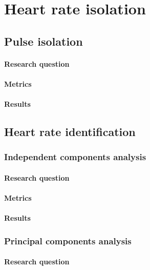 \section{Heart rate isolation}
\subsection{Pulse isolation}
\label{section:bss}
\paragraph{Research question}
\paragraph{Metrics}
\paragraph{Results}
\subsection{Heart rate identification}
\subsubsection{Independent components analysis}
\label{section:ica_assumption}
\paragraph{Research question}
\paragraph{Metrics}
\paragraph{Results}

\subsubsection{Principal components analysis}
\paragraph{Research question}
